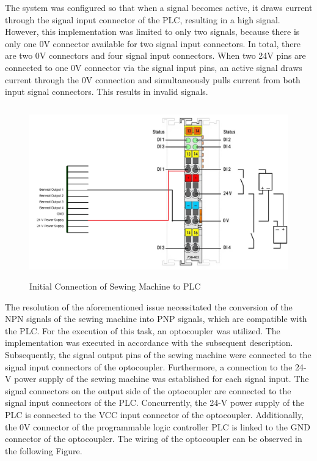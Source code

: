 The system was configured so that when a signal becomes active, it draws current through the signal input connector of the PLC, resulting in a high signal. However, this implementation was limited to only two signals, because there is only one 0V connector available for two signal input connectors. In total, there are two 0V connectors and four signal input connectors. When two 24V pins are connected to one 0V connector via the signal input pins, an active signal draws current through the 0V connection and simultaneously pulls current from both input signal connectors. This results in invalid signals. 
\begin{figure}[H]
	\includegraphics[height=7.4cm]{pic/sewing-machine-plc-init.png}
	\caption{Initial Connection of Sewing Machine to PLC}
	\label{fig:Model-Component-Pattern}
\end{figure}
The resolution of the aforementioned issue necessitated the conversion of the NPN signals of the sewing machine into PNP signals, which are compatible with the PLC. For the execution of this task, an optocoupler was utilized. The implementation was executed in accordance with the subsequent description. Subsequently, the signal output pins of the sewing machine were connected to the signal input connectors of the optocoupler. Furthermore, a connection to the 24-V power supply of the sewing machine was established for each signal input. The signal connectors on the output side of the optocoupler are connected to the signal input connectors of the PLC. Concurrently, the 24-V power supply of the PLC is connected to the VCC input connector of the optocoupler. Additionally, the 0V connector of the programmable logic controller PLC is linked to the GND connector of the optocoupler. The wiring of the optocoupler can be observed in the following Figure.
